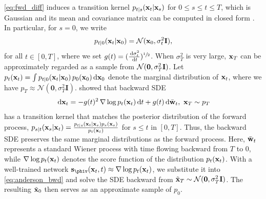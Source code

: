 

\cref{eq:fwd_diff} induces a transition kernel $p_{t|s}(\mathbf{x}_t | \mathbf{x}_s)$ for $0 \leq s \leq t \leq T$, which is Gaussian and its mean and covariance matrix can be computed in closed form \citep[Eqs 4.23 and 5.51]{SarkkaSolin2019}. In particular, for $s = 0$, we write 
\begin{align}
    p_{t|0}(\mathbf{x}_t | \mathbf{x}_0) = \mathcal{N}(\mathbf{x}_0, \sigma_t^2 \mathbf{I}),
\end{align}  
for all $ t \in [0, T] $, where we set $g(t) = (\frac{\,\mathrm{d} \sigma^2_t}{\,\mathrm{d} t})^{\sfrac{1}{2}}$. 
When $\sigma_T^2$ is very large, $\mathbf{x}_T$ can be approximately regarded as a sample from $\mathcal{N}(\mathbf{0}, \sigma_T^2 \mathbf{I})$. Let $ p_t(\mathbf{x}_t) = \int p_{t|0}(\mathbf{x}_t \vert \mathbf{x}_0) \, p_0(\mathbf{x}_0) \, \mathrm{d} \mathbf{x}_0 $ denote the marginal distribution of $\mathbf{x}_t$, where we have $ p_T \approx \mathcal{N}(\mathbf{0}, \sigma_T^2 \mathbf{I}) $. \citet{anderson1982} showed that backward SDE
\begin{align}
	\,\mathrm{d} \mathbf{x}_t = - g(t)^2 \, \nabla \log p_t(\mathbf{x}_t) \,\mathrm{d} t + g(t) \,\mathrm{d} \bar{\mathbf{w}}_t, ~\mathbf{x}_T \sim p_T \label{eq:anderson_bwd}
\end{align}
has a transition kernel that matches the posterior distribution of the forward process, $p_{s|t}(\mathbf{x}_s | \mathbf{x}_t) = \tfrac{p_{t|s}(\mathbf{x}_t | \mathbf{x}_s)  p_s(\mathbf{x}_s)}{p_t(\mathbf{x}_t)}$ for $s \leq t$ in $[0,T]$. Thus, the backward SDE preserves the same marginal distributions as the forward process. Here, $\bar{\mathbf{w}}_t$ represents a standard Wiener process with time flowing backward from $T$ to $0$, while $\nabla \log p_t(\mathbf{x}_t)$ denotes the score function of the distribution $p_t(\mathbf{x}_t)$.  With a well-trained network $\sv_{\phiv}(\xv_t, t) \approx \nabla \log p_t(\xv_t)$, we substitute it into \cref{eq:anderson_bwd} and solve the SDE backward from $\tilde{\mathbf{x}}_T \sim \mathcal{N}(\mathbf{0}, \sigma_T^2 \mathbf{I})$. The resulting $\tilde{\mathbf{x}}_0$ then serves as an approximate sample of $p_0$.

